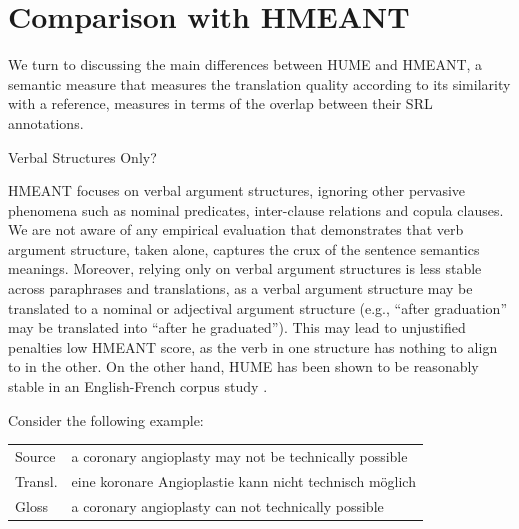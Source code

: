 \documentclass[11pt,letterpaper]{article}
\makeatletter
\renewcommand{\paragraph}{
  \@startsection{paragraph}{4}
  {\z@}{.1ex \@plus .1ex \@minus .1ex}{-1.5em}
  {\normalfont\normalsize\bfseries}
}
\makeatother
\begin{document}
\section{Comparison with HMEANT}\label{sec:hmeant_comp}

We turn to discussing the main differences between HUME and HMEANT,
a semantic measure that measures the translation quality according to its similarity
with a reference, measures in terms of the overlap between their SRL annotations.

\paragraph{Verbal Structures Only?}

HMEANT focuses on verbal
argument structures, ignoring other pervasive phenomena such as nominal predicates, inter-clause
relations and copula clauses.
We are not aware of any empirical evaluation that demonstrates that verb argument structure,
taken alone, captures the crux of the sentence semantics meanings.
Moreover, relying only on verbal argument structures is less stable across paraphrases
and translations, as a verbal argument structure
may be translated to a nominal or adjectival argument structure
(e.g., ``after graduation'' may be translated into ``after he graduated'').
This may lead to unjustified penalties low HMEANT score, as the verb
in one structure has nothing to align to in the other.
On the other hand, HUME has been shown to be reasonably stable in an English-French
corpus study \cite{sulem2015conceptual}.

Consider the following example:

\begin{center}
\begin{tabular}{lp{5.4cm}}
Source & \small a coronary angioplasty may not be technically possible \\
Transl.& \small eine koronare Angioplastie kann nicht technisch m{\"o}glich \\
Gloss & \small a coronary angioplasty can not technically possible \\
\end{tabular}
\end{center}
\end{document}
